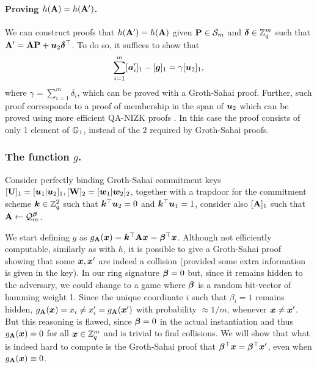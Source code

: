 \paragraph{Proving $h(\mathbf{{A}})=h(\mathbf{{A}}')$.} We can construct proofs that $h(\mathbf{{A}}') = h(\mathbf{{A}})$ given $\mathbf{{P}}\in\mathcal{S}_m$ and ${\boldsymbol{\delta}}\in\mathbb{Z}_q^m$ such that $\mathbf{{A}}' = \mathbf{{A}}\mathbf{{P}}+{\boldsymbol{u}}_2{\boldsymbol{\delta}}^\top$. To do so, it suffices to show that
\begin{equation}
\sum_{i=1}^{m}[{\boldsymbol{a}}'_i]_1 - [{\boldsymbol{g}}]_1 = \gamma[{\boldsymbol{u}}_2]_1,
\label{eq:coll-h}
\end{equation}
where $\gamma = \sum_{i=1}^m \delta_i$,
which can be proved with a Groth-Sahai proof. Further, such proof corresponds to a proof of membership in the span of ${\boldsymbol{u}}_2$ which can be proved using more efficient QA-NIZK proofs \cite{C:JutRoy14,EC:KilWee15}. In this case the proof consists of only 1 element of $\mathbb{G}_1$, instead of the $2$ required by Groth-Sahai proofs.

\subsubsection{The function $g$.} Consider perfectly binding Groth-Sahai commitment keys $[\mathbf{{U}}]_1=[{\boldsymbol{u}}_1|{\boldsymbol{u}}_2]_1,[\mathbf{{W}}]_2 = [{\boldsymbol{w}}_1|{\boldsymbol{w}}_2]_2$, together with a trapdoor for the commitment scheme ${\boldsymbol{k}}\in\mathbb{Z}_q^2$ such that ${\boldsymbol{k}}^\top{\boldsymbol{u}}_2=0$ and ${\boldsymbol{k}}^\top{\boldsymbol{u}}_1=1$, consider also $[\mathbf{{A}}]_1$ such that $\mathbf{{A}}\gets\mathcal{Q}_m^{\boldsymbol{\beta}}$.

We start defining $g$ as $g_{\mathbf{{A}}}({\boldsymbol{x}}) = {\boldsymbol{k}}^\top\mathbf{{A}}{\boldsymbol{x}} = {\boldsymbol{\beta}}^\top{\boldsymbol{x}}$. Although not efficiently computable, similarly as with $h$, it is possible to give a Groth-Sahai proof showing that some ${\boldsymbol{x}},{\boldsymbol{x}}'$ are indeed a collision (provided some extra information is given in the key).
In our ring signature ${\boldsymbol{\beta}}=0$ but, since it remains hidden to the adversary, we could change to a game where ${\boldsymbol{\beta}}$ is a random bit-vector of hamming weight 1. Since the unique coordinate $i$ such that $\beta_i=1$ remains hidden, $g_{\mathbf{{A}}}({\boldsymbol{x}}) = x_i \neq x'_i =g_{\mathbf{{A}}}({\boldsymbol{x}}')$ with probability $\approx 1/m$, whenever ${\boldsymbol{x}}\neq{\boldsymbol{x}}'$. But this reasoning is flawed, since ${\boldsymbol{\beta}}=0$ in the actual instantiation and thus $g_{\mathbf{{A}}}({\boldsymbol{x}}) = 0$ for all ${\boldsymbol{x}}\in\mathbb{Z}_q^m$ and is trivial to find collisions.
We will show that what is indeed hard to compute is the Groth-Sahai proof that ${\boldsymbol{\beta}}^\top{\boldsymbol{x}} = {\boldsymbol{\beta}}^\top{\boldsymbol{x}}'$, even when $g_{\mathbf{{A}}}({\boldsymbol{x}})\equiv 0$.

